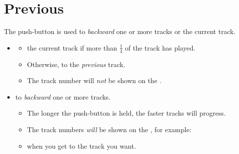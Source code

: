 
\section{Previous} \label{Audio - Previous}

The \thinspace\sPr\enspace push-button is used to  \textit{backward}
one or more tracks or  the current track.

\begin{itemize}
  \item {}
    \begin{itemize}
      \item {} the current track if more than $\frac{1}{4}$ of the track
        has played.
      \item Otherwise,  to the \textit{previous} track.
      \item The track number will \textit{not} be shown on the .
    \end{itemize}
  \item {} to  \textit{backward} one or more tracks.
    \begin{itemize}
      \item The longer the push-button is held, the faster tracks will progress.
      \item The track numbers \textit{will} be shown on the , for example:
      \item {} when you get to the track you want.
    \end{itemize}
\end{itemize}


